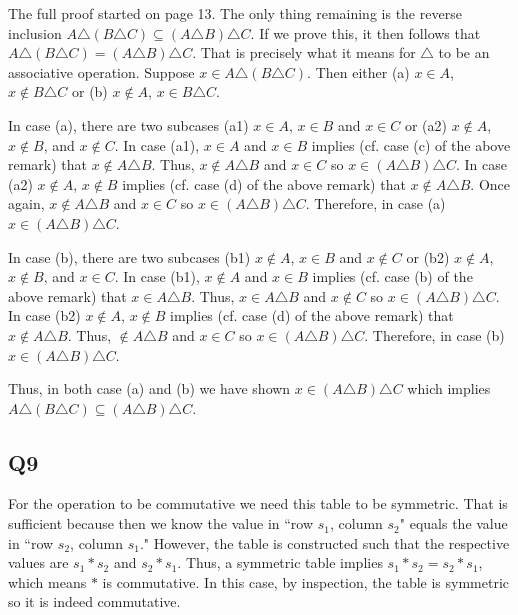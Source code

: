 \documentclass[12pt]{article}
\numberwithin{theorem}{section}
\numberwithin{equation}{section}
\numberwithin{remark}{section}
\numberwithin{definition}{section}
\numberwithin{theorem}{section}
\numberwithin{lemma}{section}
\numberwithin{example}{section}
\begin{document}
The full proof started on page 13. The only thing remaining is the reverse inclusion $A \triangle (B \triangle C) \subseteq (A \triangle B) \triangle C$. If we prove this, it then follows that $A \triangle (B \triangle C) = (A \triangle B) \triangle C$. That is precisely what it means for $\triangle$ to be an associative operation. Suppose $x \in A \triangle (B \triangle C)$. Then either (a) $x\in A$, $x \notin B \triangle C$ or (b) $x\notin A$, $x \in B \triangle C$. 

In case (a), there are two subcases (a1) $x\in A$, $x\in B$ and $x\in C$ or (a2) $x\notin A$, $x\notin B$, and $x\notin C$. In case (a1), $x\in A$ and $x\in B$ implies (cf. case (c) of the above remark) that $x\notin A\triangle B$. Thus, $x\notin A \triangle B$ and $x\in C$ so $x\in (A\triangle B) \triangle C$. In case (a2) $x\notin A$, $x\notin B$ implies (cf. case (d) of the above remark) that $x\notin A\triangle B$. Once again, $x\notin A\triangle B$ and $x\in C$ so $x\in (A\triangle B) \triangle C$. Therefore, in case (a) $x\in (A\triangle B) \triangle C$.

In case (b), there are two subcases (b1) $x\notin A$, $x\in B$ and $x\notin C$ or (b2) $x\notin A$, $x\notin B$, and $x\in C$. In case (b1), $x\notin A$ and $x\in B$ implies (cf. case (b) of the above remark) that $x\in A\triangle B$. Thus, $x\in A \triangle B$ and $x\notin C$ so $x\in (A\triangle B) \triangle C$. In case (b2) $x\notin A$, $x\notin B$ implies (cf. case (d) of the above remark) that $x\notin A\triangle B$. Thus, $\notin A\triangle B$ and $x\in C$ so $x\in (A\triangle B) \triangle C$. Therefore, in case (b) $x\in (A\triangle B) \triangle C$.

Thus, in both case (a) and (b) we have shown $x\in (A\triangle B) \triangle C$ which implies $A \triangle (B \triangle C) \subseteq (A \triangle B) \triangle C$. 



\subsection{Q9}

For the operation to be commutative we need this table to be symmetric. That is sufficient because then we know the value in ``row $s_1$, column $s_2$" equals the value in ``row $s_2$, column $s_1$." However, the table is constructed such that the respective values are $s_1 * s_2$ and $s_2 * s_1$. Thus, a symmetric table implies $s_1*s_2=s_2*s_1$, which means $*$ is commutative. In this case, by inspection, the table is symmetric so it is indeed commutative. 
\end{document}
